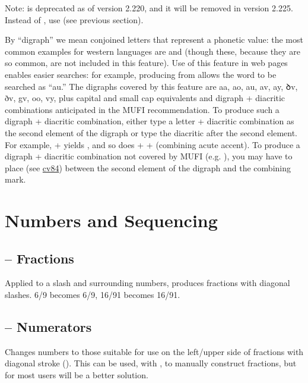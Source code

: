 {\color{red}Note}:  is deprecated as of version 2.220, and it will be removed in version 2.225.
Instead of , use   (see previous section).

By “digraph” we mean conjoined letters that represent a phonetic value: the most common examples
for western languages are \textex{{\ae}} and \textex{{\oe}} (though these, because they
are so common, are not included in this feature). Use of this feature in web pages enables easier searches: for
example, producing  from
 allows the word to be
searched as “{\th}au.” The digraphs covered by this feature are \textcolor[rgb]{0.5529412,0.15686275,0.11764706}{%
aa, ao, au, av, ay, ꝺv, ðv, gv, oo, vy,} plus capital and small cap
equivalents and digraph +
diacritic combinations anticipated in the
MUFI recommendation. To produce such a digraph + diacritic combination, either type a letter + diacritic combination as
the second element of the digraph or type the diacritic after the second element. For example,
 +  yields , and so does
 +  +  (combining acute accent). To produce a digraph +
diacritic combination not covered by MUFI (e.g. ), you may have to place 
 (see \hyperlink{cv84}{cv84}) between the second element of the digraph and the combining mark.

\section{Numbers and Sequencing}
\subsection{ – Fractions}
Applied to a slash and surrounding numbers, produces fractions with diagonal
slashes. 6/9 becomes {6/9}, 16/91 becomes {16/91}.

\subsection{ – Numerators}
Changes numbers to those suitable for use on the left/upper side of fractions
with diagonal stroke (). This can be used, with , to manually construct
fractions, but for most users  will be a better solution.

